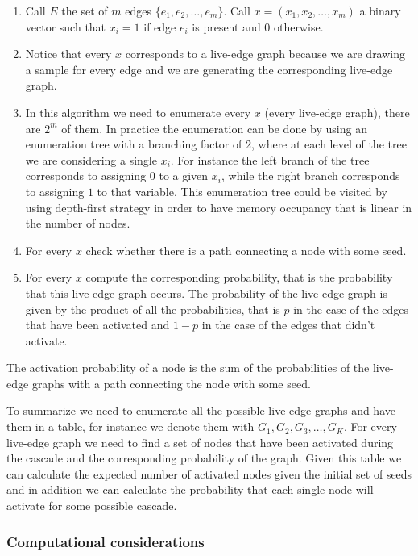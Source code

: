 \documentclass[10pt,a4paper]{article}
\begin{document}
\begin{enumerate}
\item Call $E$ the set of $m$ edges $\{e_1, e_2, \ldots, e_m \}$. Call $x = (x_1, x_2, \ldots, x_m)$ a binary vector such that $x_i = 1$ if edge $e_i$ is present and $0$ otherwise.
\item Notice that every $x$ corresponds to a live-edge graph because we are drawing a sample for every edge and we are generating the corresponding live-edge graph.
\item In this algorithm we need to enumerate every $x$ (every live-edge graph), there are $2^m$ of them. In practice the enumeration can be done by using an enumeration tree with a branching factor of $2$, where at each level of the tree we are considering a single $x_i$. For instance the left branch of the tree corresponds to assigning $0$ to a given $x_i$, while the right branch corresponds to assigning $1$ to that variable. This enumeration tree could be visited by using depth-first strategy in order to have memory occupancy that is linear in the number of nodes.
\item For every $x$ check whether there is a path connecting a node with some seed.
\item For every $x$ compute the corresponding probability, that is the probability that this live-edge graph occurs. The probability of the live-edge graph is given by the product of all the probabilities, that is $p$ in the case of the edges that have been activated and $1-p$ in the case of the edges that didn't activate.
\end{enumerate}

The activation probability of a node is the sum of the probabilities of the live-edge graphs with a path connecting the node with some seed.

To summarize we need to enumerate all the possible live-edge graphs and have them in a table, for instance we denote them with $G_1, G_2, G_3, \ldots, G_K$. For every live-edge graph we need to find a set of nodes that have been activated during the cascade and the corresponding probability of the graph. Given this table we can calculate the expected number of activated nodes given the initial set of seeds and in addition we can calculate the probability that each single node will activate for some possible cascade.

\subsubsection{Computational considerations}\label{computational-considerations}
\end{document}

